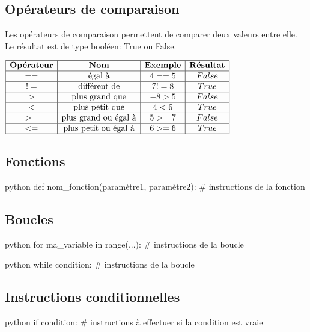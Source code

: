 \documentclass[a4paper,11pt]{article}
\begin{document}
\subsection{Opérateurs de comparaison}
Les opérateurs de comparaison permettent de comparer deux valeurs entre elle. Le résultat est de type booléen: True ou False.\par
\begin{center}
$\begin{array}{|c|c|c|c|}
\hline
\textbf{Opérateur} & \textbf{Nom} & \textbf{Exemple} & \textbf{Résultat} \\
\hline
== & \text{égal à} & 4 == 5 & False\\
\hline
!= & \text{différent de} & 7 != 8 & True\\
\hline
> & \text{plus grand que} &  -8 > 5 & False\\
\hline
< & \text{plus petit que} & 4 < 6 & True\\
\hline
>= & \text{plus grand ou égal à} &  5 >= 7 & False\\
\hline
<= & \text{plus petit ou égal à} & 6 >= 6 & True\\
\hline
\end{array}$
\end{center}

\subsection{Fonctions}
\begin{code}{python}
def nom_fonction(paramètre1, paramètre2):
  # instructions de la fonction
\end{code}

\subsection{Boucles}
\begin{code}{python}
for ma_variable in range(...):
  # instructions de la boucle
\end{code}

\begin{code}{python}
while condition:
  # instructions de la boucle
\end{code}

\subsection{Instructions conditionnelles}
\begin{code}{python}
if condition:
  # instructions à effectuer si la condition est vraie
\end{code}
\end{document}
